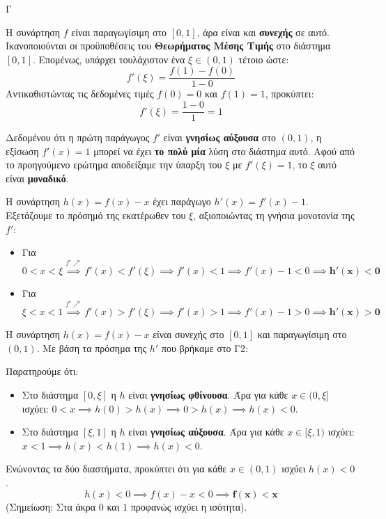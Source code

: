 \begin{thema}{Γ}
\begin{erwthma}
\item Η συνάρτηση $f$ είναι παραγωγίσιμη στο $[0, 1]$, άρα είναι και \textbf{συνεχής} σε αυτό.
Ικανοποιούνται οι προϋποθέσεις του \textbf{Θεωρήματος Μέσης Τιμής} στο διάστημα $[0, 1]$.
Επομένως, υπάρχει τουλάχιστον ένα $\xi \in (0, 1)$ τέτοιο ώστε:
\[ f'(\xi) = \frac{f(1) - f(0)}{1 - 0} \]
Αντικαθιστώντας τις δεδομένες τιμές $f(0) = 0$ και $f(1) = 1$, προκύπτει:
\[ f'(\xi) = \frac{1 - 0}{1} = 1 \]

\item Δεδομένου ότι η πρώτη παράγωγος $f'$ είναι \textbf{γνησίως αύξουσα} στο $(0, 1)$, η εξίσωση $f'(x) = 1$ μπορεί να έχει \textbf{το πολύ μία} λύση στο διάστημα αυτό. Αφού από το προηγούμενο ερώτημα αποδείξαμε την ύπαρξη του $\xi$ με $f'(\xi)=1$, το $\xi$ αυτό είναι \textbf{μοναδικό}.

Η συνάρτηση $h(x) = f(x) - x$ έχει παράγωγο $h'(x) = f'(x) - 1$.
Εξετάζουμε το πρόσημό της εκατέρωθεν του $\xi$, αξιοποιώντας τη γνήσια μονοτονία της $f'$:
\begin{itemize}
    \item Για $0 < x < \xi \overset{f' \nearrow}{\implies} f'(x) < f'(\xi) \implies f'(x) < 1 \implies f'(x) - 1 < 0 \implies \boldsymbol{h'(x) < 0}$
    \item Για $\xi < x < 1 \overset{f' \nearrow}{\implies} f'(x) > f'(\xi) \implies f'(x) > 1 \implies f'(x) - 1 > 0 \implies \boldsymbol{h'(x) > 0}$
\end{itemize}

\item Η συνάρτηση $h(x) = f(x) - x$ είναι συνεχής στο $[0, 1]$ και παραγωγίσιμη στο $(0, 1)$.
Με βάση τα πρόσημα της $h'$ που βρήκαμε στο Γ2:
\begin{center}
\end{center}
Παρατηρούμε ότι:
\begin{itemize}
    \item Στο διάστημα $[0, \xi]$ η $h$ είναι \textbf{γνησίως φθίνουσα}. 
    Άρα για κάθε $x \in (0, \xi]$ ισχύει: $0 < x \implies h(0) > h(x) \implies 0 > h(x) \implies h(x) < 0$.
    \item Στο διάστημα $[\xi, 1]$ η $h$ είναι \textbf{γνησίως αύξουσα}. 
    Άρα για κάθε $x \in [\xi, 1)$ ισχύει: $x < 1 \implies h(x) < h(1) \implies h(x) < 0$.
\end{itemize}
Ενώνοντας τα δύο διαστήματα, προκύπτει ότι για κάθε $x \in (0, 1)$ ισχύει $h(x) < 0$.
\[ h(x) < 0 \implies f(x) - x < 0 \implies \boldsymbol{f(x) < x} \]
(Σημείωση: Στα άκρα $0$ και $1$ προφανώς ισχύει η ισότητα).


\end{erwthma}
\end{thema}
